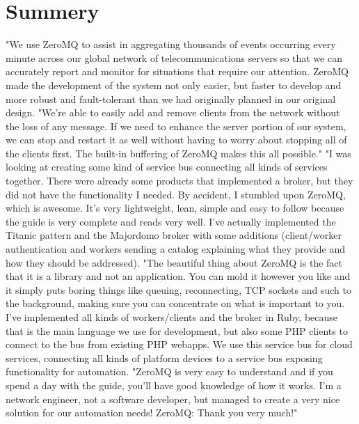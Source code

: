\documentclass[a4paper,12pt,oneside]{report}
\begin{document}
\section{Summery}

"We use ZeroMQ to assist in aggregating thousands of events occurring every minute across our global
network of telecommunications servers so that we can accurately report and monitor for situations that
require our attention. ZeroMQ made the development of the system not only easier, but faster to develop
and more robust and fault-tolerant than we had originally planned in our original design.
"We’re able to easily add and remove clients from the network without the loss of any message. If we
need to enhance the server portion of our system, we can stop and restart it as well without having to
worry about stopping all of the clients ﬁrst. The built-in buffering of ZeroMQ makes this all possible."
"I was looking at creating some kind of service bus connecting all kinds of services together. There were
already some products that implemented a broker, but they did not have the functionality I needed. By
accident, I stumbled upon ZeroMQ, which is awesome. It’s very lightweight, lean, simple and easy to
follow because the guide is very complete and reads very well. I’ve actually implemented the Titanic
pattern and the Majordomo broker with some additions (client/worker authentication and workers
sending a catalog explaining what they provide and how they should be addressed).
"The beautiful thing about ZeroMQ is the fact that it is a library and not an application. You can mold it
however you like and it simply puts boring things like queuing, reconnecting, TCP sockets and such to
the background, making sure you can concentrate on what is important to you. I’ve implemented all
kinds of workers/clients and the broker in Ruby, because that is the main language we use for
development, but also some PHP clients to connect to the bus from existing PHP webapps. We use this
service bus for cloud services, connecting all kinds of platform devices to a service bus exposing
functionality for automation.
"ZeroMQ is very easy to understand and if you spend a day with the guide, you’ll have good knowledge
of how it works. I’m a network engineer, not a software developer, but managed to create a very nice
solution for our automation needs! ZeroMQ: Thank you very much!"

\newpage 
\end{document}
